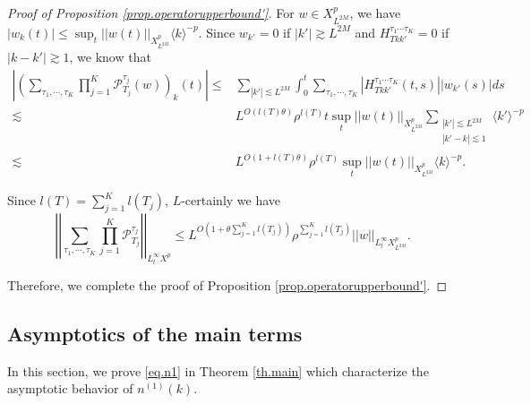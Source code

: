 \begin{proof}[Proof of Proposition \ref{prop.operatorupperbound'}]
For $w\in X^{p}_{L^{2M}}$, we have $|w_k(t)|\le \sup_{t}||w(t)||_{X^{p}_{L^{2M}}} \langle k\rangle^{-p}$. Since $w_{k'}=0$ if $|k'|\gtrsim L^{2M}$ and $H^{\tau_1\cdots \tau_{K}}_{Tkk'}=0$ if $|k-k'|\gtrsim 1$, we know that
\begin{equation}
\begin{split}
    \left|\left(\sum_{\tau_1,\cdots, \tau_{K}}\prod_{j=1}^K\mathcal{P}^{\tau_j}_{T_j}(w)\right)_{k}(t)\right|\le&\sum_{|k'|\lesssim L^{2M}}\int_0^t \sum_{\tau_1,\cdots, \tau_{K}}|H^{\tau_1\cdots \tau_{K}}_{Tkk'}(t,s)| |w_{k'}(s)| ds
    \\
    \lesssim&  L^{O(l(T)\theta)}  \rho^{l(T)}t \sup_{t}||w(t)||_{X^{p}_{L^{2M}}} \sum_{\substack{|k'|\lesssim L^{2M}\\ |k'-k|\lesssim 1}} \langle k'\rangle^{-p}
    \\
    \lesssim& L^{O(1+l(T)\theta)}  \rho^{l(T)} \sup_{t}||w(t)||_{X^{p}_{L^{2M}}}  \langle k\rangle^{-p}.
\end{split}
\end{equation}

Since $l(T)=\sum_{j=1}^K l(T_j)$, $L$-certainly we have 
\begin{equation}
    \left|\left|\sum_{\tau_1,\cdots,\tau_K}\prod_{j=1}^K\mathcal{P}^{\tau_j}_{T_j}\right|\right|_{L_t^{\infty}X^{p}}\le L^{O\left(1+\theta\sum_{j=1}^K l(T_j)\right)} \rho^{\sum_{j=1}^K l(T_j)}||w||_{L_t^{\infty}X^{p}_{L^{2M}}}.
\end{equation}

Therefore, we complete the proof of Proposition \ref{prop.operatorupperbound'}.
\end{proof}



\subsection{Asymptotics of the main terms} In this section, we prove \eqref{eq.n1} in Theorem \ref{th.main} which characterize the asymptotic behavior of $n^{(1)}(k)$.

